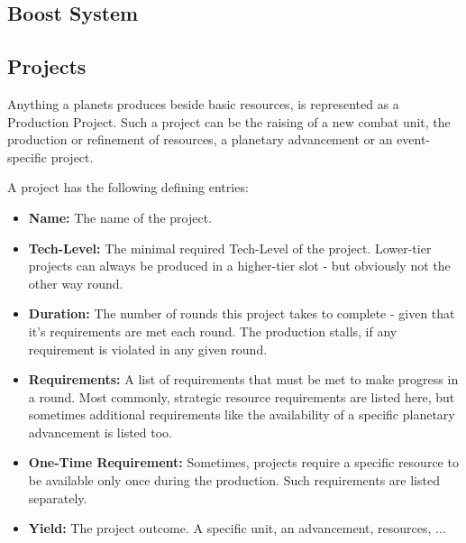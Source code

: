 \subsection{Boost System}

\subsection{Projects} 
Anything a planets produces beside basic resources, is represented as a Production Project. Such a project can be the raising of a new combat unit, the production or refinement of resources, a planetary advancement or an event-specific project. 

A project has the following defining entries: 

\begin{itemize} 

\item \textbf{Name:} The name of the project.  

\item \textbf{Tech-Level:} The minimal required Tech-Level of the project. Lower-tier projects can always be produced in a higher-tier slot - but obviously not the other way round. 

\item \textbf{Duration:} The number of rounds this project takes to complete - given that it's requirements are met each round. The production stalls, if any requirement is violated in any given round. 

\item \textbf{Requirements:} A list of requirements that must be met to make progress in a round. Most commonly, strategic resource requirements are listed here, but sometimes additional requirements like the availability of a specific planetary advancement is listed too. 

\item \textbf{One-Time Requirement:} Sometimes, projects require a specific resource to be available only once during the production. Such requirements are listed separately. 

\item \textbf{Yield:} The project outcome. A specific unit, an advancement, resources, ... 

\end{itemize} 

